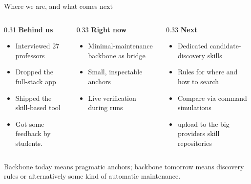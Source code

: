 \documentclass[11pt,aspectratio=169]{beamer}
\begin{document}
\begin{frame}{Where we are, and what comes next}
  \small
  \begin{columns}[T]
    \begin{column}{0.31\textwidth}
      \textbf{Behind us}
      \begin{itemize}
        \item Interviewed 27 professors
        \item Dropped the full-stack app
        \item Shipped the skill-based tool
        \item Got some feedback by students.
      \end{itemize}
    \end{column}
    \begin{column}{0.33\textwidth}
      \textbf{Right now}
      \begin{itemize}
        \item Minimal-maintenance backbone as bridge
        \item Small, inspectable anchors
        \item Live verification during runs
      \end{itemize}
    \end{column}
    \begin{column}{0.33\textwidth}
      \textbf{Next}
      \begin{itemize}
        \item Dedicated candidate-discovery skills
        \item Rules for where and how to search
        \item Compare via command simulations
        \item upload to the big providers skill repositories
      \end{itemize}
    \end{column}
  \end{columns}
  \vspace{1.2em}
  \begin{center}
    \alert{Backbone today means pragmatic anchors; backbone tomorrow means discovery rules or alternatively some kind of automatic maintenance.}
  \end{center}
\end{frame}
\end{document}
